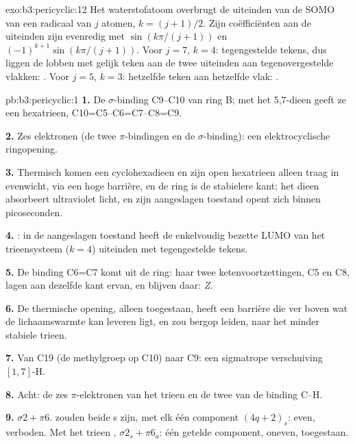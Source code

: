 \begin{solution}{exo:b3:pericyclic:12}
Het waterstofatoom overbrugt de uiteinden van de SOMO van een radicaal van $j$ atomen, $k = (j + 1)/2$. Zijn
coëfficiënten aan de uiteinden zijn evenredig met $\sin(k\pi/(j + 1))$ en $(-1)^{k+1}\sin(k\pi/(j + 1))$. Voor $j = 7$, $k = 4$: tegengestelde tekens, dus
liggen de lobben met gelijk teken aan de twee uiteinden aan
tegenovergestelde vlakken: . Voor
$j = 5$, $k = 3$: hetzelfde teken aan hetzelfde vlak: .
\end{solution}

\begin{solution}{pb:b3:pericyclic:1}
\textbf{1.} De $\sigma$-binding C9--C10 van ring B; met het 5,7-dieen geeft ze een hexatrieen,
C10=C5--C6=C7--C8=C9.

\textbf{2.} Zes elektronen (de twee $\pi$-bindingen en de $\sigma$-binding): een elektrocyclische ringopening.

\textbf{3.} Thermisch komen een cyclohexadieen en zijn open hexatrieen
alleen traag in evenwicht, via een hoge barrière, en de ring is de
stabielere kant; het dieen absorbeert ultraviolet licht, en zijn
aangeslagen toestand opent zich binnen picoseconden.

\textbf{4.} : in de aangeslagen toestand heeft de enkelvoudig bezette LUMO van het
trieensysteem ($k = 4$) uiteinden met tegengestelde tekens.

\textbf{5.} De binding C6=C7 komt uit de ring: haar twee ketenvoortzettingen, C5 en C8,
lagen aan dezelfde kant ervan, en blijven daar: \textit{Z}.

\textbf{6.} De thermische opening, alleen  toegestaan, heeft
een barrière die ver boven wat de lichaamswarmte kan leveren ligt, en zou
bergop leiden, naar het minder stabiele trieen.

\textbf{7.} Van C19 (de methylgroep op C10) naar C9: een sigmatrope verschuiving $[1,7]$-H.

\textbf{8.} Acht: de zes $\pi$-elektronen van het trieen en de twee van de binding C--H.

\textbf{9.} $\sigma2 + \pi6$.  zouden beide s zijn, met elk één component $(4q + 2)_s$:
even, verboden. Met het trieen , $\sigma2_s + \pi6_a$: één getelde component, oneven,
toegestaan.


\end{solution}
